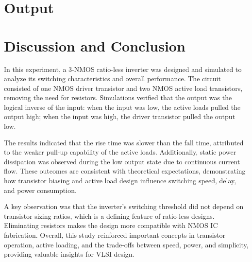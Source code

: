 \documentclass[12pt]{article}
\begin{document}
\section*{Output}



\section*{Discussion and Conclusion}
In this experiment, a 3-NMOS ratio-less inverter was designed and simulated to analyze its switching characteristics and overall performance. The circuit consisted of one NMOS driver transistor and two NMOS active load transistors, removing the need for resistors. Simulations verified that the output was the logical inverse of the input: when the input was low, the active loads pulled the output high; when the input was high, the driver transistor pulled the output low.

The results indicated that the rise time was slower than the fall time, attributed to the weaker pull-up capability of the active loads. Additionally, static power dissipation was observed during the low output state due to continuous current flow. These outcomes are consistent with theoretical expectations, demonstrating how transistor biasing and active load design influence switching speed, delay, and power consumption.

A key observation was that the inverter’s switching threshold did not depend on transistor sizing ratios, which is a defining feature of ratio-less designs. Eliminating resistors makes the design more compatible with NMOS IC fabrication. Overall, this study reinforced important concepts in transistor operation, active loading, and the trade-offs between speed, power, and simplicity, providing valuable insights for VLSI design.

\renewcommand{\bibname}{References}

\end{document}
